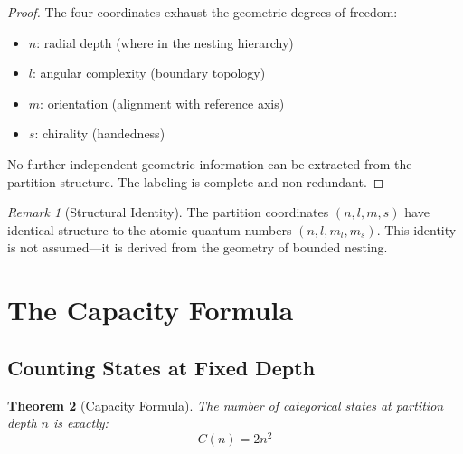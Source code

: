 \documentclass[twocolumn,10pt,a4paper]{article}
\newtheorem{theorem}{Theorem}[section]
\theoremstyle{definition}
\theoremstyle{remark}
\newtheorem{remark}[theorem]{Remark}
\begin{document}
\begin{proof}
The four coordinates exhaust the geometric degrees of freedom:
\begin{itemize}
    \item $n$: radial depth (where in the nesting hierarchy)
    \item $l$: angular complexity (boundary topology)
    \item $m$: orientation (alignment with reference axis)
    \item $s$: chirality (handedness)
\end{itemize}
No further independent geometric information can be extracted from the partition structure. The labeling is complete and non-redundant.
\end{proof}

\begin{remark}[Structural Identity]
The partition coordinates $(n, l, m, s)$ have identical structure to the atomic quantum numbers $(n, l, m_l, m_s)$. This identity is not assumed---it is derived from the geometry of bounded nesting.
\end{remark}

\section{The Capacity Formula}
\label{sec:capacity}

\subsection{Counting States at Fixed Depth}

\begin{theorem}[Capacity Formula]
\label{thm:capacity}
The number of categorical states at partition depth $n$ is exactly:
\begin{equation}
    C(n) = 2n^2
\end{equation}
\end{theorem}
\end{document}
